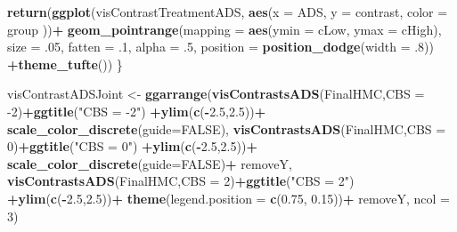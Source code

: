 \documentclass[10pt,dvipsnames,enabledeprecatedfontcommands]{scrartcl}
\newenvironment{Shaded}{\begin{snugshade}}{\end{snugshade}}
\newcommand{\KeywordTok}[1]{\textcolor[rgb]{0.13,0.29,0.53}{\textbf{#1}}}
\newcommand{\DataTypeTok}[1]{\textcolor[rgb]{0.13,0.29,0.53}{#1}}
\newcommand{\DecValTok}[1]{\textcolor[rgb]{0.00,0.00,0.81}{#1}}
\newcommand{\FloatTok}[1]{\textcolor[rgb]{0.00,0.00,0.81}{#1}}
\newcommand{\StringTok}[1]{\textcolor[rgb]{0.31,0.60,0.02}{#1}}
\newcommand{\OtherTok}[1]{\textcolor[rgb]{0.56,0.35,0.01}{#1}}
\newcommand{\OperatorTok}[1]{\textcolor[rgb]{0.81,0.36,0.00}{\textbf{#1}}}
\newcommand{\NormalTok}[1]{#1}
\begin{document}
\begin{Shaded}
\begin{Highlighting}[]
  \KeywordTok{return}\NormalTok{(}\KeywordTok{ggplot}\NormalTok{(visContrastTreatmentADS, }\KeywordTok{aes}\NormalTok{(}\DataTypeTok{x =}\NormalTok{ ADS, }\DataTypeTok{y =}\NormalTok{ contrast, }\DataTypeTok{color =}\NormalTok{ group ))}\OperatorTok{+}
\StringTok{  }\KeywordTok{geom_pointrange}\NormalTok{(}\DataTypeTok{mapping =} \KeywordTok{aes}\NormalTok{(}\DataTypeTok{ymin =}\NormalTok{ cLow, }\DataTypeTok{ymax =}\NormalTok{ cHigh), }\DataTypeTok{size =} \FloatTok{.05}\NormalTok{,}
                  \DataTypeTok{fatten =} \FloatTok{.1}\NormalTok{, }\DataTypeTok{alpha =} \FloatTok{.5}\NormalTok{, }
                  \DataTypeTok{position =} \KeywordTok{position_dodge}\NormalTok{(}\DataTypeTok{width =} \FloatTok{.8}\NormalTok{)) }\OperatorTok{+}\KeywordTok{theme_tufte}\NormalTok{())}
\NormalTok{\}}



\NormalTok{visContrastADSJoint <-}\StringTok{ }\KeywordTok{ggarrange}\NormalTok{(}\KeywordTok{visContrastsADS}\NormalTok{(FinalHMC,}\DataTypeTok{CBS =} \DecValTok{-2}\NormalTok{)}\OperatorTok{+}\KeywordTok{ggtitle}\NormalTok{(}\StringTok{"CBS = -2"}\NormalTok{)}
                                 \OperatorTok{+}\KeywordTok{ylim}\NormalTok{(}\KeywordTok{c}\NormalTok{(}\OperatorTok{-}\FloatTok{2.5}\NormalTok{,}\FloatTok{2.5}\NormalTok{))}\OperatorTok{+}\StringTok{ }\KeywordTok{scale_color_discrete}\NormalTok{(}\DataTypeTok{guide=}\OtherTok{FALSE}\NormalTok{),}
                                 \KeywordTok{visContrastsADS}\NormalTok{(FinalHMC,}\DataTypeTok{CBS =} \DecValTok{0}\NormalTok{)}\OperatorTok{+}\KeywordTok{ggtitle}\NormalTok{(}\StringTok{"CBS = 0"}\NormalTok{)}
                                 \OperatorTok{+}\KeywordTok{ylim}\NormalTok{(}\KeywordTok{c}\NormalTok{(}\OperatorTok{-}\FloatTok{2.5}\NormalTok{,}\FloatTok{2.5}\NormalTok{))}\OperatorTok{+}\StringTok{ }\KeywordTok{scale_color_discrete}\NormalTok{(}\DataTypeTok{guide=}\OtherTok{FALSE}\NormalTok{)}\OperatorTok{+}
\StringTok{                                   }\NormalTok{removeY,}
                                 \KeywordTok{visContrastsADS}\NormalTok{(FinalHMC,}\DataTypeTok{CBS =} \DecValTok{2}\NormalTok{)}\OperatorTok{+}\KeywordTok{ggtitle}\NormalTok{(}\StringTok{"CBS = 2"}\NormalTok{)}
                                 \OperatorTok{+}\KeywordTok{ylim}\NormalTok{(}\KeywordTok{c}\NormalTok{(}\OperatorTok{-}\FloatTok{2.5}\NormalTok{,}\FloatTok{2.5}\NormalTok{))}\OperatorTok{+}
\StringTok{                                   }\KeywordTok{theme}\NormalTok{(}\DataTypeTok{legend.position =} \KeywordTok{c}\NormalTok{(}\FloatTok{0.75}\NormalTok{, }\FloatTok{0.15}\NormalTok{))}\OperatorTok{+}
\StringTok{                                   }\NormalTok{removeY, }\DataTypeTok{ncol =} \DecValTok{3}\NormalTok{)}


\end{Highlighting}
\end{Shaded}
\end{document}
